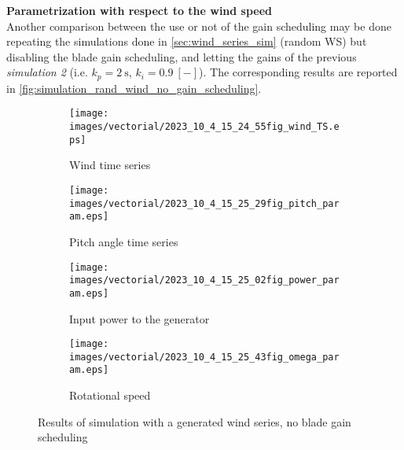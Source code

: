 \textbf{Parametrization with respect to the wind speed}\\
Another comparison between the use or not of the gain scheduling may be done repeating the simulations done in \autoref{sec:wind_series_sim} (random WS) but disabling the blade gain scheduling, and letting the gains of the previous \textit{simulation 2} (i.e. $k_p = 2 \ \si{\second}$, $k_i=0.9 \ [-]$). The corresponding results are reported in \autoref{fig:simulation_rand_wind_no_gain_scheduling}.
\begin{figure}[htb]
  \begin{subfigure}{0.5\columnwidth}
    \centering
    \texttt{[image: images/vectorial/2023\_10\_4\_15\_24\_55fig\_wind\_TS.eps]}
    \caption{Wind time series}
    \label{fig:2023_05_8_22_43_35fig_wind_TS.eps}
  \end{subfigure}
  \begin{subfigure}{0.5\columnwidth}
    \centering
    \texttt{[image: images/vectorial/2023\_10\_4\_15\_25\_29fig\_pitch\_param.eps]}
    \caption{Pitch angle time series}
    \label{fig:2023_05_8_22_44_05fig_pitch_param}
  \end{subfigure}
  \begin{subfigure}{0.5\columnwidth}
    \centering
    \texttt{[image: images/vectorial/2023\_10\_4\_15\_25\_02fig\_power\_param.eps]}
    \caption{Input power to the generator}
    \label{fig:2023_05_8_22_44_15fig_power_param}
  \end{subfigure}
  \begin{subfigure}{0.5\columnwidth}
    \centering
    \texttt{[image: images/vectorial/2023\_10\_4\_15\_25\_43fig\_omega\_param.eps]}
    \caption{Rotational speed}
    \label{fig:2023_05_8_23_17_57fig_omega_param}
  \end{subfigure}
  \caption{Results of simulation with a generated wind series, no blade gain scheduling}
  \label{fig:simulation_rand_wind_no_gain_scheduling}
\end{figure}


